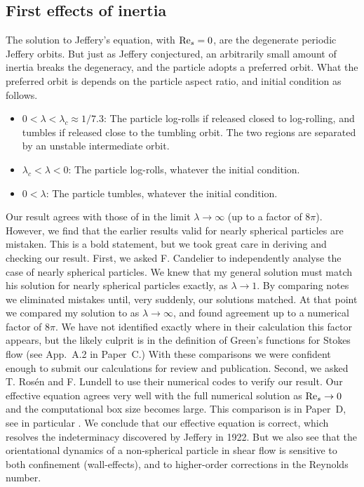 \documentclass[thesis.tex]{subfiles}
\begin{document}
\subsection{First effects of inertia}

The solution to Jeffery's equation,  with $\textrm{Re}_s=0$, are the degenerate periodic Jeffery orbits. But just as Jeffery conjectured, an arbitrarily small amount of inertia breaks the degeneracy, and the particle adopts a preferred orbit. What the preferred orbit is depends on the particle aspect ratio, and initial condition as follows.
\begin{itemize}
    \item $0 < \lambda < \lambda_c \approx 1/7.3$: The particle log-rolls if released closed to log-rolling, and tumbles if released close to the tumbling orbit. The two regions are separated by an unstable intermediate orbit.
    \item $\lambda_c < \lambda < 0$: The particle log-rolls, whatever the initial condition.
    \item $0 < \lambda$: The particle tumbles, whatever the initial condition.
\end{itemize}

Our result  agrees with those of \citet{subramanian2005} in the limit $\lambda\to\infty$ (up to a factor of $8\pi$). However, we find that the earlier results valid for nearly spherical particles \cite{saffman1956,subramanian2006} are mistaken. This is a bold statement, but we took great care in deriving and checking our result. First, we asked F. Candelier to independently analyse the case of nearly spherical particles. We knew that my general solution must match his solution for nearly spherical particles exactly, as $\lambda\to1$. By comparing notes we eliminated mistakes until, very suddenly, our solutions matched. At that point we compared my solution to \citet{subramanian2005} as $\lambda\to\infty$, and found agreement up to a numerical factor of $8\pi$. We have not identified exactly where in their calculation this factor appears, but the likely culprit is in the definition of Green's functions for Stokes flow (see App.~A.2 in Paper~C.) With these comparisons we were confident enough to submit our calculations for review and publication. Second, we asked T. Ros\'en and F. Lundell to use their numerical codes to verify our result. Our effective equation  agrees very well with the full numerical solution as $\textrm{Re}_s\to0$ and the computational box size becomes large. This comparison is in Paper~D, see in particular . We conclude that our effective equation is correct, which resolves the indeterminacy discovered by Jeffery in 1922. But we also see that the orientational dynamics of a non-spherical particle in shear flow is sensitive to both confinement (wall-effects), and to higher-order corrections in the Reynolds number.
\end{document}
